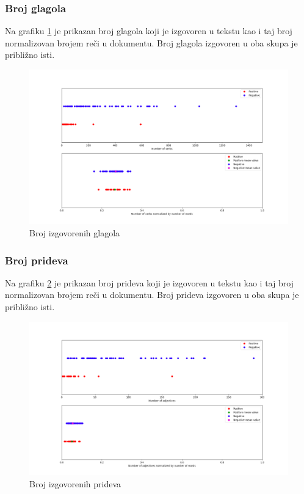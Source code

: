 \documentclass[12pt,oneside]{memoir}
\begin{document}
\FloatBarrier

\subsubsection{Broj glagola}

Na grafiku \ref{img:glagoli} je prikazan broj glagola koji je izgovoren u tekstu kao i taj broj normalizovan brojem reči u dokumentu.  Broj glagola izgovoren u oba skupa je približno isti.  

\begin{figure}[h!]
\centering
\includegraphics[width=.9\textwidth]{images/glagoli.png}
\caption{ Broj izgovorenih glagola }
\label{img:glagoli}
\end{figure}

\FloatBarrier

\subsubsection{Broj prideva}

Na grafiku \ref{img:pridevi} je prikazan broj prideva koji je izgovoren u tekstu kao i taj broj normalizovan brojem reči u dokumentu.  Broj prideva izgovoren u oba skupa je približno isti.  

\begin{figure}[ht!]
\centering
\includegraphics[width=.9\textwidth]{images/pridevi.png}
\caption{ Broj izgovorenih prideva }
\label{img:pridevi}
\end{figure}
\end{document}
